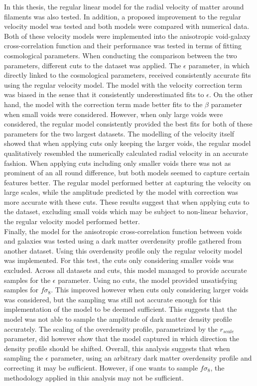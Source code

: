 In this thesis, the regular linear model for the radial velocity of matter around filaments was also tested. In addition, a proposed improvement to the regular velocity model was tested and both models were compared with numerical data. Both of these velocity models were implemented into the anisotropic void-galaxy cross-correlation function and their performance was tested in terms of fitting cosmological parameters. When conducting the comparison between the two parameters, different cuts to the dataset was applied. The $\epsilon$ parameter, in which directly linked to the cosmological parameters, received consistently accurate fits using the regular velocity model. The model with the velocity correction term was biased in the sense that it consistently underestimated fits to $\epsilon$. On the other hand, the model with the correction term made better fits to the $\beta$ parameter when small voids were considered. However, when only large voids were considered, the regular model consistently provided the best fits for both of these parameters for the two largest datasets. The modelling of the velocity itself showed that when applying cuts only keeping the larger voids, the regular model qualitatively resembled the numerically calculated radial velocity in an accurate fashion. When applying cuts including only smaller voids there was not as prominent of an all round difference, but both models seemed to capture certain features better. The regular model performed better at capturing the velocity on large scales, while the amplitude predicted by the model with correction was more accurate with these cuts. These results suggest that when applying cuts to the dataset, excluding small voids which may be subject to non-linear behavior, the regular velocity model performed better.\\\indent
Finally, the model for the anisotropic cross-correlation function between voids and galaxies was tested using a dark matter overdensity profile gathered from another dataset. Using this overdensity profile only the regular velocity model was implemented. For this test, the cuts only considering smaller voids was excluded. Across all datasets and cuts, this model managed to provide accurate samples for the $\epsilon$ parameter. Using no cuts, the model provided unsatisfying samples for $f\sigma_8$. This improved however when cuts only considering larger voids was considered, but the sampling was still not accurate enough for this implementation of the model to be deemed sufficient.  This suggests that the model was not able to sample the amplitude of dark matter density profile accurately. The scaling of the overdensity profile, parametrized by the $r_{scale}$ parameter, did however show that the model captured in which direction the density profile should be shifted. Overall, this analysis suggests that when sampling the $\epsilon$ parameter, using an arbitrary dark matter overdensity profile and correcting it may be sufficient. However, if one wants to sample $f\sigma_8$, the methodology applied in this analysis may not be sufficient.
